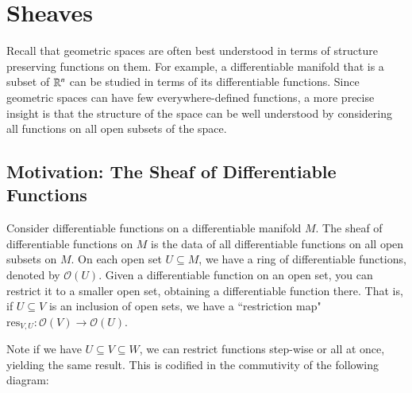%
%
%
\chapter{Sheaves}
\label{sheaves} %

Recall that geometric spaces are often best understood in terms of structure preserving functions on them. For example, a differentiable manifold that is a subset of $\mathbb R^n$ can be studied in terms of its differentiable functions. Since geometric spaces can have few everywhere-defined functions, a more precise insight is that the structure of the space can be well understood by considering all functions on all open subsets of the space.

\section{Motivation: The Sheaf of Differentiable Functions}

Consider differentiable functions on a differentiable manifold $M$. The sheaf of differentiable functions on $M$ is the data of all differentiable functions on all open subsets on $M$. On each open set $U \subseteq M$, we have a ring of differentiable functions, denoted by $\mathscr{O}(U)$. Given a differentiable function on an open set, you can restrict it to a smaller open set, obtaining a differentiable function there. That is, if $U \subseteq V$ is an inclusion of open sets, we have a ``restriction map" $\text{res}_{V,U}:\mathscr{O}(V)\rightarrow \mathscr{O}(U)$.

Note if we have $U \subseteq V \subseteq W$, we can restrict functions step-wise or all at once, yielding the same result. This is codified in the commutivity of the following diagram: 
\begin{center}
\end{center}

